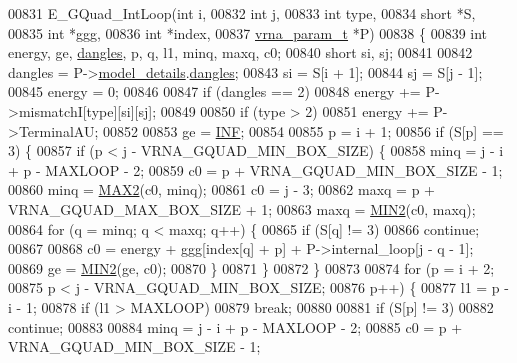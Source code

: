 \begin{DoxyCode}
00831 E\_GQuad\_IntLoop(\textcolor{keywordtype}{int}           i,
00832                 \textcolor{keywordtype}{int}           j,
00833                 \textcolor{keywordtype}{int}           type,
00834                 \textcolor{keywordtype}{short}         *S,
00835                 \textcolor{keywordtype}{int}           *ggg,
00836                 \textcolor{keywordtype}{int}           *index,
00837                 \hyperlink{group__energy__parameters_structvrna__param__s}{vrna\_param\_t}  *P)
00838 \{
00839   \textcolor{keywordtype}{int}   energy, ge, \hyperlink{group__model__details_ga72b511ed1201f7e23ec437e468790d74}{dangles}, p, q, l1, minq, maxq, c0;
00840   \textcolor{keywordtype}{short} si, sj;
00841 
00842   dangles = P->\hyperlink{group__energy__parameters_a7b84353eb9075c595bad4ceb871bcae7}{model\_details}.\hyperlink{group__model__details_adcda4ff2ea77748ae0e8700288282efc}{dangles};
00843   si      = S[i + 1];
00844   sj      = S[j - 1];
00845   energy  = 0;
00846 
00847   \textcolor{keywordflow}{if} (dangles == 2)
00848     energy += P->mismatchI[type][si][sj];
00849 
00850   \textcolor{keywordflow}{if} (type > 2)
00851     energy += P->TerminalAU;
00852 
00853   ge = \hyperlink{constants_8h_a12c2040f25d8e3a7b9e1c2024c618cb6}{INF};
00854 
00855   p = i + 1;
00856   \textcolor{keywordflow}{if} (S[p] == 3) \{
00857     \textcolor{keywordflow}{if} (p < j - VRNA\_GQUAD\_MIN\_BOX\_SIZE) \{
00858       minq  = j - i + p - MAXLOOP - 2;
00859       c0    = p + VRNA\_GQUAD\_MIN\_BOX\_SIZE - 1;
00860       minq  = \hyperlink{group__utils_ga33297b3679c713b0c4d897cd0fe3b122}{MAX2}(c0, minq);
00861       c0    = j - 3;
00862       maxq  = p + VRNA\_GQUAD\_MAX\_BOX\_SIZE + 1;
00863       maxq  = \hyperlink{group__utils_gae0b9cd0ce090bd69b951aa73e8fa4f7d}{MIN2}(c0, maxq);
00864       \textcolor{keywordflow}{for} (q = minq; q < maxq; q++) \{
00865         \textcolor{keywordflow}{if} (S[q] != 3)
00866           \textcolor{keywordflow}{continue};
00867 
00868         c0  = energy + ggg[index[q] + p] + P->internal\_loop[j - q - 1];
00869         ge  = \hyperlink{group__utils_gae0b9cd0ce090bd69b951aa73e8fa4f7d}{MIN2}(ge, c0);
00870       \}
00871     \}
00872   \}
00873 
00874   \textcolor{keywordflow}{for} (p = i + 2;
00875        p < j - VRNA\_GQUAD\_MIN\_BOX\_SIZE;
00876        p++) \{
00877     l1 = p - i - 1;
00878     \textcolor{keywordflow}{if} (l1 > MAXLOOP)
00879       \textcolor{keywordflow}{break};
00880 
00881     \textcolor{keywordflow}{if} (S[p] != 3)
00882       \textcolor{keywordflow}{continue};
00883 
00884     minq  = j - i + p - MAXLOOP - 2;
00885     c0    = p + VRNA\_GQUAD\_MIN\_BOX\_SIZE - 1;

\end{DoxyCode}
